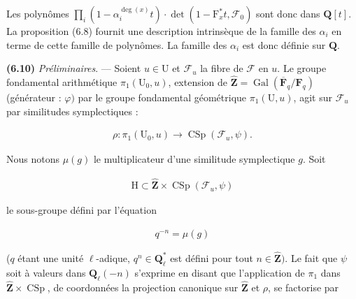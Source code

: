 \documentclass[10pt,leqno]{article}
\begin{document}
\noindent Les polynômes \(\prod _{i}(1- \alpha _{i}^{\operatorname{deg}(x)}t)\cdot \operatorname{det}(1- \mathrm{F}_{x}^{*}t,\mathcal{F} _{0})\) sont donc dans \(\mathbf{Q}[t]\). La proposition (6.8) fournit une description intrinsèque de la famille des \(\alpha _{i}\) en terme de cette famille de polynômes. La famille des \(\alpha _{i}\) est donc définie sur \(\mathbf{Q}\).\par

\noindent \textbf{(6.10)} \emph{Préliminaires}. — Soient \(u\in \mathrm{U}\) et \(\mathcal{F} _{u}\) la fibre de \(\mathcal{F} \) en \(u\). Le groupe fondamental arithmétique \(\pi _{1}(\mathrm{U}_{0},u)\), extension de \(\widehat{\mathbf{Z}}=\operatorname{Gal}(\overline{\mathbf{F}}_{q}/\mathbf{F}_{q})\) (générateur : \(\varphi )\) par le groupe fondamental géométrique \(\pi _{1}(\mathrm{U},u)\), agit sur \(\mathcal{F} _{u}\) par similitudes symplectiques :\par

\begin{equation*}\begin{gathered}\rho  : \pi _{1}(\mathrm{U}_{0},u) \longrightarrow  \operatorname{CSp}(\mathcal{F} _{u},\psi ).\end{gathered}\end{equation*}

\clearpage

\label{physical-27}\setcounter{page}{298}

\noindent Nous notons \(\mu (g)\) le multiplicateur d’une similitude symplectique \(g\). Soit\par

\begin{equation*}\begin{gathered}\mathrm{H}\subset \widehat{\mathbf{Z}}\times \operatorname{CSp}(\mathcal{F} _{u},\psi )\end{gathered}\end{equation*}

\noindent le sous-groupe défini par l’équation\par

\begin{equation*}\begin{gathered}q^{- n}=\mu (g)\end{gathered}\end{equation*}

\noindent (\(q\) étant une unité \(\ell \)-adique, \(q^{n}\in \mathbf{Q}_{\ell }^{*}\) est défini pour tout \(n\in \widehat{\mathbf{Z}})\). Le fait que \(\psi \) soit à valeurs dans \(\mathbf{Q}_{\ell }(- n)\) s’exprime en disant que l’application de \(\pi _{1}\) dans \(\widehat{\mathbf{Z}}\times \operatorname{CSp}\), de coordonnées la projection canonique sur \(\widehat{\mathbf{Z}}\) et \(\rho \), se factorise par\par
\end{document}

